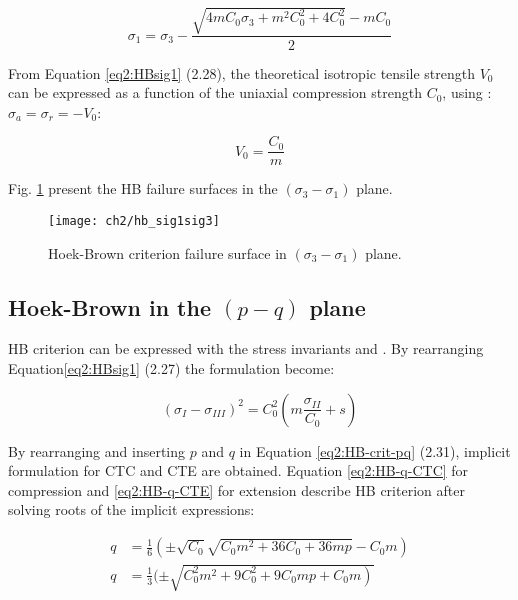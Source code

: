 \begin{equation}
    \sigma_{1}=\sigma_{3} - \frac{\sqrt{4 m C_{0} \sigma_{3}+m^{2} C_{0}^{2}+4 C_{0}^{2}}-m C_{0}}{2}
\end{equation}

From Equation \ref{eq2:HBsig1} (2.28), the theoretical isotropic tensile strength $V_0$ can be expressed as a function of the uniaxial compression strength $C_0$, using : $\sigma_a = \sigma_r = -V_0$:

\begin{equation}
    V_0 = \frac{C_0}{m}
\end{equation}

Fig. \ref{fig2:hb_sig1sig3} present the HB failure surfaces in the $(\sigma_3 -\sigma_1)$ plane. 

\begin{figure}[tb]
    \centering
    \texttt{[image: ch2/hb\_sig1sig3]}
    \caption{Hoek-Brown criterion failure surface in $(\sigma_3 -\sigma_1)$ plane.}
    \label{fig2:hb_sig1sig3}
\end{figure} 

\subsection{Hoek-Brown in the \texorpdfstring{$(p-q)$}{p-q} plane}

HB criterion can be expressed with the stress invariants  and . By rearranging Equation\ref{eq2:HBsig1} (2.27) the formulation become:

\begin{equation}\label{eq2:HB-crit-pq}
    \left(\sigma_{I}-\sigma_{I I I}\right)^{2}=C_{0}^{2}\left(m \frac{\sigma_{I I}}{C_{0}}+s\right)
\end{equation}

By rearranging and inserting $p$  and $q$ in Equation \ref{eq2:HB-crit-pq} (2.31), implicit formulation for CTC and CTE are obtained. Equation \ref{eq2:HB-q-CTC} for compression and \ref{eq2:HB-q-CTE} for extension describe HB criterion after solving roots of the implicit expressions:  


\begin{align}
    q&=\frac{1}{6}\left(\pm \sqrt{C_{0}} \sqrt{C_{0} m^{2}+36 C_{0}+36 m p}-C_{0} m\right) \label{eq2:HB-q-CTC} \\
    q&=\frac{1}{3}(\pm \sqrt{\left.C_{0}^{2} m^{2}+9 C_{0}^{2}+9 C_{0} m p+C_{0} m\right)} \label{eq2:HB-q-CTE}
\end{align}

